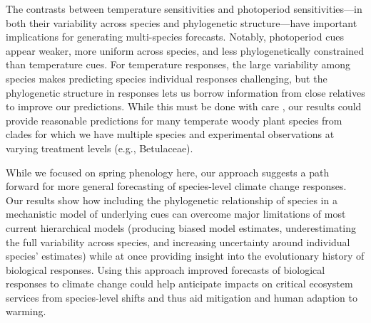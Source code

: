 \documentclass[11pt]{article}
\begin{document}
The contrasts between temperature sensitivities and photoperiod sensitivities---in both their variability across species and phylogenetic structure---have important implications for generating multi-species forecasts. Notably, photoperiod cues appear weaker, more uniform across species, and less phylogenetically constrained than temperature cues. For temperature responses, the large variability among species makes predicting species individual responses challenging, but the phylogenetic structure in responses lets us borrow information from close relatives to improve our predictions. While this must be done with care \citep{molina2018assessing}, our results could provide reasonable predictions for many temperate woody plant species from clades for which we have multiple species and experimental observations at varying treatment levels (e.g., Betulaceae). 

While we focused on spring phenology here, our approach suggests a path forward for more general forecasting of species-level climate change responses. Our results show how including the phylogenetic relationship of species in a mechanistic model of underlying cues can overcome major limitations of most current hierarchical models (producing biased model estimates, underestimating the full variability across species, and increasing uncertainty around individual species' estimates) while at once providing insight into the evolutionary history of biological responses. Using this approach improved forecasts of biological responses to climate change could help anticipate impacts on critical ecosystem services from species-level shifts and thus aid mitigation and human adaption to warming. 
\end{document}
